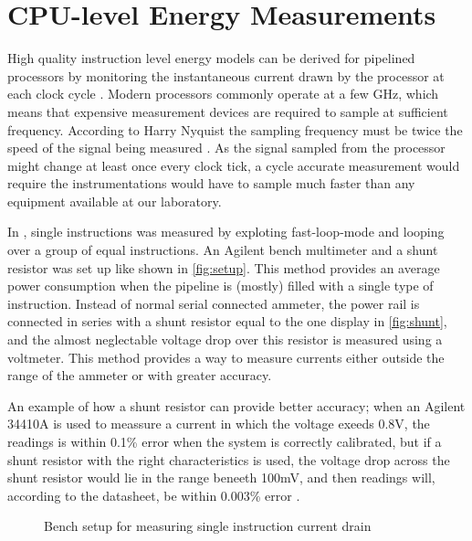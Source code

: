 \section{CPU-level Energy Measurements}
\label{sec:energymeasure}

High quality instruction level energy models can be derived for pipelined
processors by monitoring the instantaneous current drawn by the processor at
each clock cycle \cite{nikolaidis2005instruction}. Modern processors commonly
operate at a few GHz, which means that expensive measurement devices are
required to sample at sufficient frequency. According to Harry Nyquist the
sampling frequency must be twice the speed of the signal being measured
\cite{nyquist1928certain}. As the signal sampled from the processor might
change at least once every clock tick, a cycle accurate measurement would
require the instrumentations would have to sample much faster than any equipment
available at our laboratory.

In \cite{rundehvatum2013exploring}, single instructions was measured by
exploting fast-loop-mode and looping over a group of equal instructions. An
Agilent bench multimeter and a shunt resistor was set up like shown in
\autoref{fig:setup}. This method provides an average power consumption when the
pipeline is (mostly) filled with a single type of instruction. Instead of normal
serial connected ammeter, the power rail is connected in series with a shunt
resistor equal to the one display in \autoref{fig:shunt}, and the almost
neglectable voltage drop over this resistor is measured using a voltmeter. This
method provides a way to measure currents either outside the range of the ammeter or with
greater accuracy.

An example of how a shunt resistor can provide better accuracy; when an Agilent
34410A is used to meassure a current in which the voltage exeeds 0.8V, the
readings is within 0.1\% error when the system is correctly calibrated, but if a
shunt resistor with the right characteristics is used, the voltage drop across
the shunt resistor would lie in the range beneeth 100mV, and then readings will,
according to the datasheet, be within 0.003\% error \cite{agilent34410a}.

\begin{figure}
    \centering
    
    \caption{Bench setup for measuring single instruction current drain}
    \label{fig:setup}
\end{figure}

